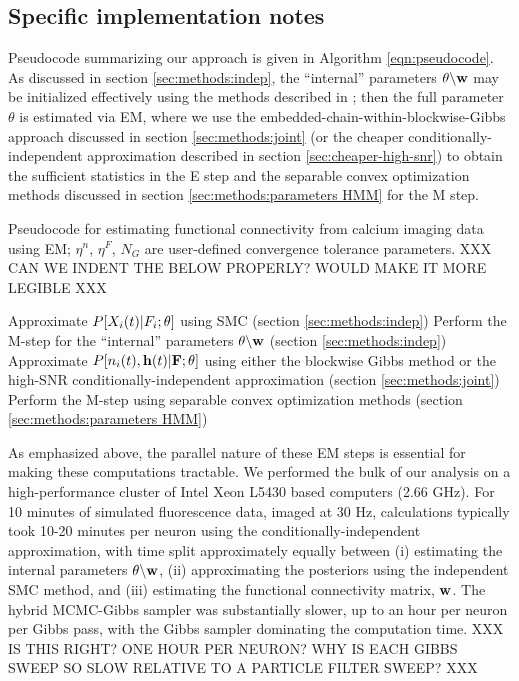 \subsection{Specific implementation notes} \label{sec:methods:specific_implementation}

Pseudocode summarizing our approach is given in Algorithm
\ref{eqn:pseudocode}.  As discussed in section
\ref{sec:methods:indep}, the ``internal'' parameters $\theta
\backslash \mathbf{w}$ may be initialized effectively using the methods
described in \cite{Vogelstein2009}; then the full parameter $\theta$
is estimated via EM, where we use the
embedded-chain-within-blockwise-Gibbs approach discussed in section
\ref{sec:methods:joint} (or the cheaper conditionally-independent
approximation described in section \ref{sec:cheaper-high-snr}) to
obtain the sufficient statistics in the E step and the separable
convex optimization methods discussed in section
\ref{sec:methods:parameters HMM} for the M step.

\begin{algorithm}
\caption{Pseudocode for estimating functional connectivity from
calcium imaging data using EM; $\eta^n$, $\eta^F$, $N_G$ are
user-defined convergence tolerance parameters.   XXX CAN WE INDENT
THE BELOW PROPERLY?  WOULD MAKE IT MORE LEGIBLE XXX}
\label{eqn:pseudocode}
\begin{algorithmic}
      \State Approximate $P[X_i(t)|F_i; \mathbf{\theta}]$ using SMC (section
  \ref{sec:methods:indep})
      \State Perform the M-step for the ``internal'' parameters
  $\theta \backslash \mathbf{w}$ (section \ref{sec:methods:indep}) 
    \EndWhile
  \EndFor
      \State Approximate $P[n_i(t), \mathbf{h}(t) |{\bf F}; \mathbf{\theta}]$ using
  either the blockwise Gibbs method or the high-SNR
  conditionally-independent approximation (section \ref{sec:methods:joint})
    \EndFor
  	\State Perform the M-step using separable convex optimization
  methods (section \ref{sec:methods:parameters HMM})  
  \EndFor
\EndWhile
\end{algorithmic}
\end{algorithm}

As emphasized above, the parallel nature of these EM steps is
essential for making these computations tractable.  We performed the
bulk of our analysis on a high-performance cluster of Intel Xeon L5430
based computers (2.66 GHz). For 10 minutes of simulated fluorescence
data, imaged at $30$ Hz, calculations typically took 10-20 minutes per
neuron using the conditionally-independent approximation, with time
split approximately equally between (i) estimating the internal
parameters $\theta \backslash \mathbf{w}$, (ii) approximating the posteriors
using the independent SMC method, and (iii) estimating the functional
connectivity matrix, $\mathbf{w}$.  The hybrid MCMC-Gibbs sampler was
substantially slower, up to an hour per neuron per Gibbs pass, with
the Gibbs sampler dominating the computation time.  XXX IS THIS RIGHT?
ONE HOUR PER NEURON?  WHY IS EACH GIBBS SWEEP SO SLOW RELATIVE TO A
PARTICLE FILTER SWEEP? XXX


